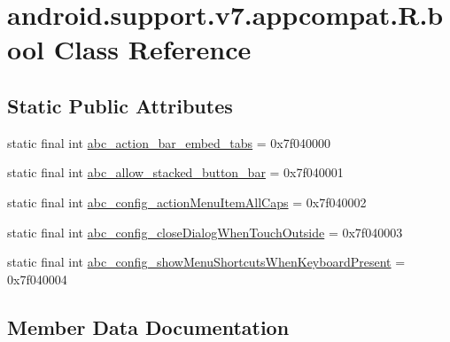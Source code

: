 \hypertarget{classandroid_1_1support_1_1v7_1_1appcompat_1_1R_1_1bool}{}\section{android.\+support.\+v7.\+appcompat.\+R.\+bool Class Reference}
\label{classandroid_1_1support_1_1v7_1_1appcompat_1_1R_1_1bool}
\subsection*{Static Public Attributes}
\begin{DoxyCompactItemize}
\item 
static final int \mbox{\hyperlink{classandroid_1_1support_1_1v7_1_1appcompat_1_1R_1_1bool_a6db41ba5a7c26fd22cbf03d4d2b037a3}{abc\+\_\+action\+\_\+bar\+\_\+embed\+\_\+tabs}} = 0x7f040000
\item 
static final int \mbox{\hyperlink{classandroid_1_1support_1_1v7_1_1appcompat_1_1R_1_1bool_a17ef40ec47db2450e1d511b32cafe11d}{abc\+\_\+allow\+\_\+stacked\+\_\+button\+\_\+bar}} = 0x7f040001
\item 
static final int \mbox{\hyperlink{classandroid_1_1support_1_1v7_1_1appcompat_1_1R_1_1bool_ad6fe2e82a81c57a39a1cf48ac06ea06a}{abc\+\_\+config\+\_\+action\+Menu\+Item\+All\+Caps}} = 0x7f040002
\item 
static final int \mbox{\hyperlink{classandroid_1_1support_1_1v7_1_1appcompat_1_1R_1_1bool_a688db2f19b7f1b88da592373c9cac8e1}{abc\+\_\+config\+\_\+close\+Dialog\+When\+Touch\+Outside}} = 0x7f040003
\item 
static final int \mbox{\hyperlink{classandroid_1_1support_1_1v7_1_1appcompat_1_1R_1_1bool_a3ab19dbca326c1a267728200308d7a3d}{abc\+\_\+config\+\_\+show\+Menu\+Shortcuts\+When\+Keyboard\+Present}} = 0x7f040004
\end{DoxyCompactItemize}


\subsection{Member Data Documentation}
\mbox{\label{classandroid_1_1support_1_1v7_1_1appcompat_1_1R_1_1bool_a6db41ba5a7c26fd22cbf03d4d2b037a3}} 
